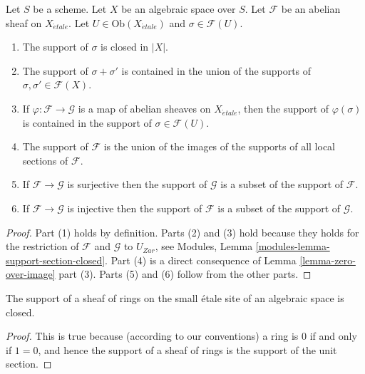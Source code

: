 \begin{lemma}
\label{lemma-support-section-closed}
Let $S$ be a scheme.
Let $X$ be an algebraic space over $S$.
Let $\mathcal{F}$ be an abelian sheaf on $X_{\acute{e}tale}$.
Let $U \in \text{Ob}(X_{\acute{e}tale})$ and $\sigma \in \mathcal{F}(U)$.
\begin{enumerate}
\item The support of $\sigma$ is closed in $|X|$.
\item The support of $\sigma + \sigma'$ is contained in the union of
the supports of $\sigma, \sigma' \in \mathcal{F}(X)$.
\item If $\varphi : \mathcal{F} \to \mathcal{G}$ is a map of
abelian sheaves on $X_{\acute{e}tale}$, then the support of $\varphi(\sigma)$ is
contained in the support of $\sigma \in \mathcal{F}(U)$.
\item The support of $\mathcal{F}$ is the union of the images of the
supports of all local sections of $\mathcal{F}$.
\item If $\mathcal{F} \to \mathcal{G}$ is surjective then the support
of $\mathcal{G}$ is a subset of the support of $\mathcal{F}$.
\item If $\mathcal{F} \to \mathcal{G}$ is injective then the support
of $\mathcal{F}$ is a subset of the support of $\mathcal{G}$.
\end{enumerate}
\end{lemma}

\begin{proof}
Part (1) holds by definition.
Parts (2) and (3) hold because they holds for the restriction of
$\mathcal{F}$ and $\mathcal{G}$ to $U_{Zar}$, see
Modules, Lemma \ref{modules-lemma-support-section-closed}.
Part (4) is a direct consequence of
Lemma \ref{lemma-zero-over-image} part (3).
Parts (5) and (6) follow from the other parts.
\end{proof}

\begin{lemma}
\label{lemma-support-sheaf-rings-closed}
The support of a sheaf of rings on the small \'etale site of an
algebraic space is closed.
\end{lemma}

\begin{proof}
This is true because (according to our conventions)
a ring is $0$ if and only if
$1 = 0$, and hence the support of a sheaf of rings
is the support of the unit section.
\end{proof}






